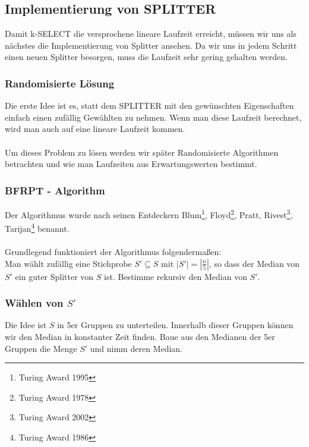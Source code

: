 \begin{description}
\subsection{Implementierung von SPLITTER}

Damit k-SELECT die versprochene lineare Laufzeit erreicht, müssen wir uns als nächstes die Implementierung von Splitter ansehen. Da wir uns in jedem Schritt einen neuen Splitter besorgen, muss die Laufzeit sehr gering gehalten werden.

\subsubsection{Randomisierte Lösung}

Die erste Idee ist es, statt dem SPLITTER mit den gewünschten Eigenschaften einfach einen zufällig Gewählten zu nehmen. Wenn man diese Laufzeit berechnet, wird man auch auf eine lineare Laufzeit kommen.\\
\vspace{\baselineskip}\\
Um dieses Problem zu lösen werden wir später Randomisierte Algorithmen betrachten und wie man Laufzeiten aus Erwartungswerten bestimmt.

\subsubsection{BFRPT - Algorithm}

Der Algorithmus wurde nach seinen Entdeckern Blum\footnote{Turing Award 1995}, Floyd\footnote{Turing Award 1978}, Pratt, Rivest\footnote{Turing Award 2002}, Tarijan\footnote{Turing Award 1986} benannt.\\
\vspace{\baselineskip}\\
Grundlegend funktioniert der Algorithmus folgendermaßen:\\
Man wählt zufällig eine Stichprobe $S' \subseteq S$ mit $\left| S' \right| = \left| \frac{n}{5} \right|$, so dass der Median von $S'$ ein guter Splitter von $S$ ist. Bestimme rekursiv den Median von $S'$.

\subsubsection{Wählen von $S'$}

Die Idee ist $S$ in 5er Gruppen zu unterteilen. Innerhalb dieser Gruppen können wir den Median in konstanter Zeit finden. Baue aus den Medianen der 5er Gruppen die Menge $S'$ und nimm deren Median.


\end{description}
